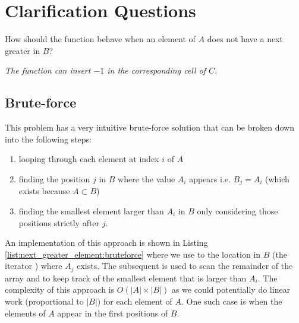 \section{Clarification Questions}

\begin{QandA}
	\begin{questionitem} \begin{question} How should the function behave when an element of $A$ does not have a next greater in $B$?  \end{question} 	 
    \begin{answered}
		\textit{The function can insert $-1$ in the corresponding cell of $C$.}
	\end{answered} \end{questionitem}
	
\end{QandA}

\subsection{Brute-force}
\label{next_greater_element:sec:bruteforce}
This problem has a very intuitive brute-force solution that can be broken down into the following steps:
\begin{enumerate}
	\item looping through each element at index $i$ of $A$
	\item finding the position $j$ in $B$ where the value $A_i$ appears i.e. $B_j = A_i$ (which
	exists because $A \subset B$)
	\item finding the smallest element larger than $A_i$ in $B$ only considering those positions strictly
	after $j$.
\end{enumerate}
An implementation of this approach is shown in Listing \ref{list:next_greater_element:bruteforce}
where we use  to the location in $B$ (the iterator ) where $A_j$
exists. The subsequent  is used to scan the remainder of the array and to keep track
of the smallest element that is larger than $A_i$. The complexity of this approach is $O(|A| \times
|B|)$ as we could potentially do linear  work (proportional to $|B|$) for each  element of
$A$. One such case is when the elements of $A$ appear in the first positions of $B$. 



